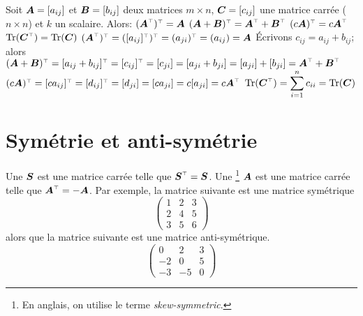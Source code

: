 \begin{theo}
    Soit $\boldsymbol{A}=[a_{ij}]$ et $\boldsymbol{B} = [b_{ij}]$ deux matrices $m\times n$, $\boldsymbol{C} = [c_{ij}]$ une
    matrice carrée ($n\times n$) et $k$ un scalaire.  Alors:
     $\transp{(\transp{\matA})} = \matA$
     $\transp{(\matA+\matB)} = \transp{\matA} + \transp{\matB}$
     $ \transp{(c\matA)} = c \transp{\matA}$
     $ \tr(\transp{\matC}) = \tr(\matC)$
    \proof
     $\transp{(\transp{\matA})} = \transp{(\transp{[a_{ij}]})} = \transp{(a_{ji})} = (a_{ij}) = \matA$
     Écrivons $c_{ij} = a_{ij} + b_{ij}$; alors \\ \hspace*{1pt}\hfill $\transp{(\matA+\matB)} = \transp{[a_{ij} + b_{ij}]}
        = \transp{[c_{ij}]} = [c_{ji}] = [a_{ji} + b_{ji}] = [a_{ji}] + [b_{ji}] = \transp{\matA} + \transp{\matB}$
     $ \transp{(c\matA)} = \transp{[c a_{ij}]} = \transp{[d_{ij}]} = [d_{ji}] = [ca_{ji}] = c [a_{ji}] = c \transp{\matA}$
     $ \displaystyle\tr(\transp{\matC}) = \sum_{i=1}^n c_{ii} = \tr(\matC)$ \cqfd
\end{theo}

\section{Symétrie et anti-symétrie}

Une   $\boldsymbol{S}$ est une matrice carrée telle que $\transp{\mat{S}} = \mat{S}$.
Une \footnote{En anglais, on utilise le terme \textit{skew-symmetric}.}  $\boldsymbol{A}$ est une matrice carrée telle que $\transp{\matA} = -\matA$.
Par exemple, la matrice suivante est une matrice symétrique
\[
\begin{pmatrix}
1 & 2 & 3 \\
2 & 4 & 5 \\
3 & 5 & 6
\end{pmatrix}
\]
alors que la matrice suivante est une matrice anti-symétrique.
\[
\begin{pmatrix}
0 & 2 & 3\\
-2 & 0 & 5 \\
-3 & -5 & 0
\end{pmatrix}
\]


